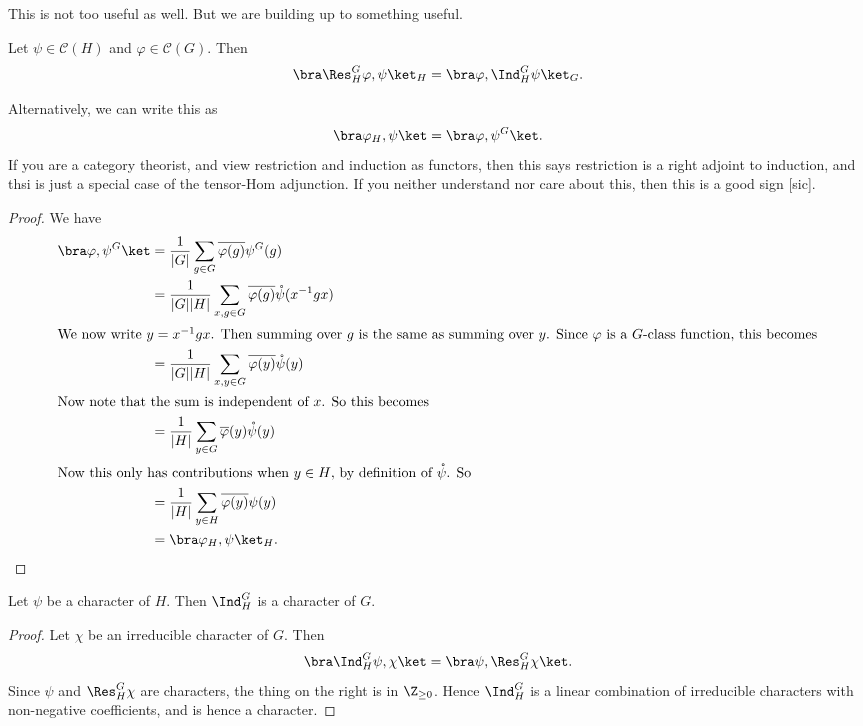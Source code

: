 \documentclass[a4paper]{article}
\begin{document}
This is not too useful as well. But we are building up to something useful.

\begin{thm}
  Let $\psi \in \mathcal{C}(H)$ and $\varphi \in \mathcal{C}(G)$. Then
  \[
    \bra \Res_H^G \varphi, \psi\ket_H = \bra \varphi, \Ind_H^G \psi\ket_G.
  \]
\end{thm}
Alternatively, we can write this as
\[
  \bra \varphi_H, \psi\ket = \bra \varphi, \psi^G\ket.
\]
If you are a category theorist, and view restriction and induction as functors, then this says restriction is a right adjoint to induction, and thsi is just a special case of the tensor-Hom adjunction. If you neither understand nor care about this, then this is a good sign [sic].

\begin{proof}
  We have
  \begin{align*}
    \bra \varphi, \psi^G\ket &= \frac{1}{|G|} \sum_{g \in G} \overline{\varphi(g)}\psi^G(g) \\
    &= \frac{1}{|G||H|} \sum_{x, g \in G} \overline{\varphi(g)} \mathring{\psi}(x^{-1}gx)\\
    \intertext{We now write $y = x^{-1} gx$. Then summing over $g$ is the same as summing over $y$. Since $\varphi$ is a $G$-class function, this becomes}
    &= \frac{1}{|G||H|} \sum_{x, y \in G} \overline{\varphi(y)} \mathring{\psi}(y)\\
    \intertext{Now note that the sum is independent of $x$. So this becomes}
    &=\frac{1}{|H|} \sum_{y \in G} \overline{\varphi}(y) \mathring{\psi}(y)\\
    \intertext{Now this only has contributions when $y \in H$, by definition of $\mathring{\psi}$. So}
    &= \frac{1}{|H|} \sum_{y \in H} \overline{\varphi(y)}\psi(y)\\
    &= \bra \varphi_H, \psi\ket_H.
  \end{align*}
\end{proof}

\begin{cor}
  Let $\psi$ be a character of $H$. Then $\Ind_H^G$ is a character of $G$.
\end{cor}

\begin{proof}
  Let $\chi$ be an irreducible character of $G$. Then
  \[
    \bra \Ind_H^G \psi, \chi\ket = \bra \psi, \Res_H^G \chi\ket.
  \]
  Since $\psi$ and $\Res_H^G \chi$ are characters, the thing on the right is in $\Z_{\geq 0}$. Hence $\Ind_H^G$ is a linear combination of irreducible characters with non-negative coefficients, and is hence a character.
\end{proof}
\end{document}
